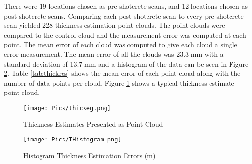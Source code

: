 There were 19 locations chosen as pre-shotcrete scans, and 12 locations chosen as post-shotcrete scans. Comparing each post-shotcrete scan to every pre-shotcrete scan yielded 228 thickness estimation point clouds. The point clouds were compared to the control cloud and the measurement error was computed at each point. The mean error of each cloud was computed to give each cloud a single error measurement. The mean error of all the clouds was 23.3 mm with a standard deviation of 13.7 mm and a histogram of the data can be seen in Figure \ref{fig:thist}. Table \ref{tab:thickres} shows the mean error of each point cloud along with the number of data points per cloud. Figure \ref{fig:thickeg} shows a typical thickness estimate point cloud.\\

\begin{figure}
    \centering
    \texttt{[image: Pics/thickeg.png]}
    \caption{Thickness Estimates Presented as Point Cloud}
    \label{fig:thickeg}
\end{figure}

\begin{figure}
    \centering
    \texttt{[image: Pics/THistogram.png]}
    \caption{Histogram Thickness Estimation Errors (m)}
    \label{fig:thist}
\end{figure}

